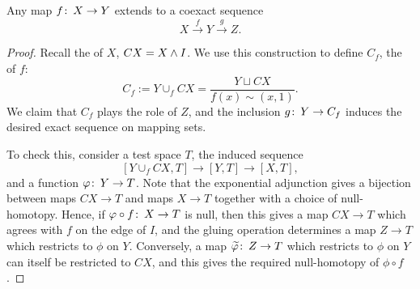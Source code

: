 \begin{lemma}\label{CoexactSeqsExist}%
Any map $f\colon\thinspace X \to Y$ extends to a coexact sequence \[X \xrightarrow f Y \xrightarrow g Z.\]
\end{lemma}
\begin{proof}
Recall the  of $X$, $CX = X \wedge I$.
We use this construction to define $C_f$, the  of $f$:
\[C_f := Y \cup_f CX = \frac{Y \sqcup CX}{f(x) \sim (x, 1)}.\]
We claim that $C_f$ plays the role of $Z$, and the inclusion $g\colon\thinspace Y \to C_f$ induces the desired exact sequence on mapping sets.

To check this, consider a test space $T$, the induced sequence \[[Y \cup_f CX, T] \to [Y, T] \to [X, T],\] and a function $\varphi\colon\thinspace Y \to T$.
Note that the exponential adjunction gives a bijection between maps $CX \to T$ and maps $X \to T$ together with a choice of null-homotopy.
Hence, if $\varphi \circ f\colon\thinspace X \to T$ is null, then this gives a map $CX \to T$ which agrees with $f$ on the edge of $I$, and the gluing operation determines a map $Z \to T$ which restricts to $\phi$ on $Y$.
Conversely, a map $\widetilde {\varphi}\colon\thinspace Z \to T$ which restricts to $\phi$ on $Y$ can itself be restricted to $CX$, and this gives the required null-homotopy of $\phi \circ f$.
\end{proof}

